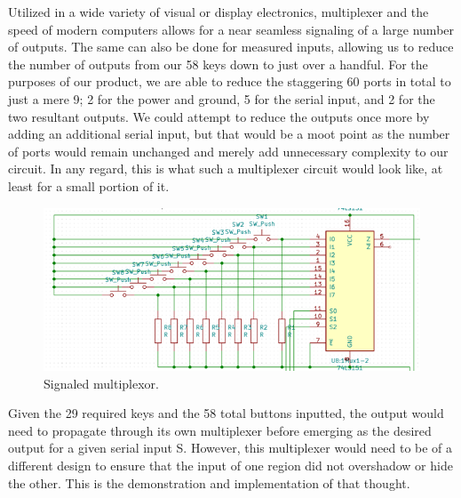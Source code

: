 Utilized in a wide variety of visual or display electronics, multiplexer and the speed of
modern computers allows for a near seamless signaling of a large number of outputs. The
same can also be done for measured inputs, allowing us to reduce the number of outputs
from our 58 keys down to just over a handful. For the purposes of our product, we are able
to reduce the staggering 60 ports in total to just a mere 9; 2 for the power and ground, 5
for the serial input, and 2 for the two resultant outputs. We could attempt to reduce the
outputs once more by adding an additional serial input, but that would be a moot point as
the number of ports would remain unchanged and merely add unnecessary complexity to our
circuit. In any regard, this is what such a multiplexer circuit would look like, at least
for a small portion of it.

\begin{figure}[h!]
  \centering
  \includegraphics[width=\linewidth]{image/signaledmultiplexor.png}
  \caption{Signaled multiplexor.}
\end{figure}


Given the 29 required keys and the 58 total buttons inputted, the output would need to
propagate through its own multiplexer before emerging as the desired output for a given
serial input S. However, this multiplexer would need to be of a different design to ensure
that the input of one region did not overshadow or hide the other. This is the
demonstration and implementation of that thought.

